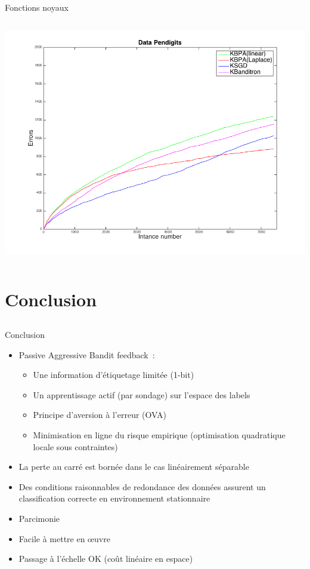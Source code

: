 \documentclass{beamer}
\begin{document}
\begin{frame}{Fonctions noyaux}
\begin{columns}[t]
\begin{column}{.45\linewidth}
	\centerline{
		\includegraphics[width=\linewidth]{figs/Pendigits_kernel_CM.png}}
		\end{column}	
	\end{columns}
\end{frame}

\section{Conclusion}
\subsection{}
\begin{frame}{Conclusion}
	\begin{itemize}
		\item Passive Aggressive Bandit feedback~:
		\begin{itemize}
			\item Une information d'étiquetage limitée (1-bit)
			\item Un apprentissage actif (par sondage) sur l'espace des labels 
			\item Principe d'aversion à l'erreur (OVA)
			\item Minimisation en ligne du risque empirique (optimisation quadratique locale sous contraintes)
		\end{itemize} 
		\item La perte au carré est bornée dans le cas linéairement séparable
		\item Des conditions raisonnables de redondance des données assurent un classification correcte en environnement stationnaire
		\item Parcimonie
		\item Facile à mettre en œuvre
		\item Passage à l'échelle OK (coût linéaire en espace)
	\end{itemize}
\end{frame}
\end{document}
